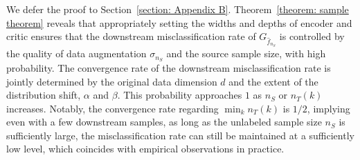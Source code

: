 We defer the proof to Section~\ref{section: Appendix B}. Theorem~\ref{theorem: sample theorem} reveals that appropriately setting the widths and depths of encoder and critic ensures that the downstream misclassification rate of $G_{\hat{f}_{n_S}}$ is controlled by the quality of data augmentation $\sigma_{n_S}$ and the source sample size, with high probability. The convergence rate of the downstream misclassification rate is jointly determined by the original data dimension $d$ and the extent of the distribution shift, $\alpha$ and $\beta$. This probability approaches $1$ as $n_S$ or $n_T(k)$ increases. Notably, the convergence rate regarding $\min_k n_T(k)$ is $1/2$, implying even with a few downstream samples, as long as the unlabeled sample size $n_S$ is sufficiently large, the misclassification rate can still be maintained at a sufficiently low level, which coincides with empirical observations in practice.

